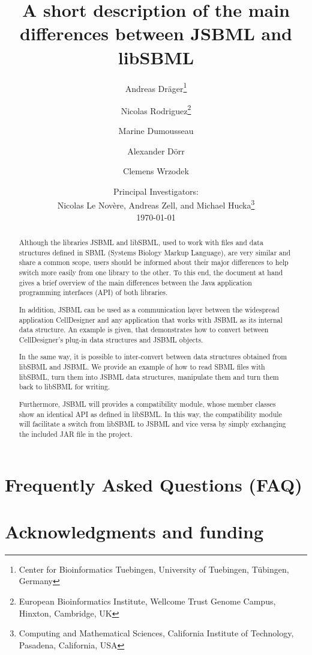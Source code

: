 \documentclass[
  BCOR12mm,
  letterpaper,
  11pt,
  headsepline,
  numbers=noenddot,
  caption=oneline,
  headinclude,
  appendixprefix,
  index=totoc,
  bibliography=totoc,
  twoside,
  titlepage
]{scrartcl}
\title{A short description of the main differences between JSBML and libSBML}
\author{Andreas Dr\"ager\thanks{Center for Bioinformatics Tuebingen, University
of Tuebingen, T\"ubingen, Germany}\and%
Nicolas Rodriguez\thanks{European Bioinformatics Institute, Wellcome Trust
Genome Campus, Hinxton, Cambridge, UK}\and%
Marine Dumousseau\footnotemark[2]\and%
Alexander D\"orr\footnotemark[1]\and%
Clemens Wrzodek\footnotemark[1]}
\date{Principal Investigators:\\
Nicolas Le Nov{\`e}re\footnotemark[2], Andreas Zell\footnotemark[1], and Michael
Hucka\thanks{Computing and Mathematical Sciences, California Institute of
Technology, Pasadena, California, USA}\\[4ex]
\today}
\begin{document}
\maketitle

\begin{abstract}
Although the libraries JSBML and libSBML, used to work with files and data
structures defined in SBML (Systems Biology Markup Language), are
very similar and share a common scope, users should be informed about their
major differences to help switch more easily from one library to the other. To
this end, the document at hand gives a brief overview of the main differences
between the Java\texttrademark{} application programming interfaces (API) of
both libraries.

In addition, JSBML can be used as a communication layer between the widespread
application CellDesigner and any application that works with JSBML as its
internal data structure. An example is given, that demonstrates how to
convert between CellDesigner's plug-in data structures and JSBML objects.

In the same way, it is possible to inter-convert between data structures
obtained from libSBML and JSBML. We provide an example of how to read SBML files
with libSBML, turn them into JSBML data structures, manipulate them and turn
them back to libSBML for writing.

Furthermore, JSBML will provides a compatibility module, whose member classes
show an identical API as defined in libSBML. In this way, the
compatibility module will facilitate a switch from libSBML to JSBML and vice
versa by simply exchanging the included JAR file in the project.


\end{abstract}

\tableofcontents


\appendix

\section{Frequently Asked Questions (FAQ)}


\section{Acknowledgments and funding}





\printindex
\end{document}
